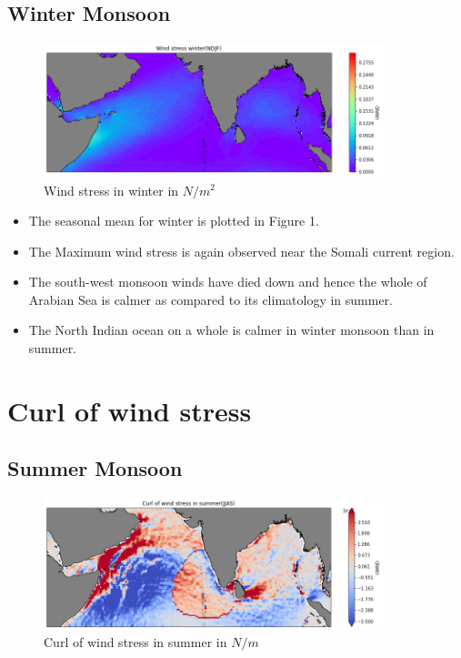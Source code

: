 \documentclass[20pt]{article}
\begin{document}
\subsection*{Winter Monsoon}

\begin{figure}
    \centering
    \includegraphics[width=0.88\textwidth]{wind_stress_winter.png}
    \caption{Wind stress in winter in $N/m^{2}$}
\end{figure}

\begin{itemize}
    \item The seasonal mean for winter is plotted in Figure 1. 
    \item The Maximum wind stress is again observed near the Somali current region.
    \item The south-west monsoon winds have died down and hence the whole of Arabian Sea is calmer as compared to its climatology in summer.
    \item The North Indian ocean on a whole is calmer in winter monsoon than in summer.
\end{itemize}

\section*{Curl of wind stress}

\subsection*{Summer Monsoon}

\begin{figure}
    \centering
    \includegraphics[width=0.88\textwidth]{curl_summer.png}
    \caption{Curl of wind stress in summer in $N/m$}
\end{figure}
\end{document}
